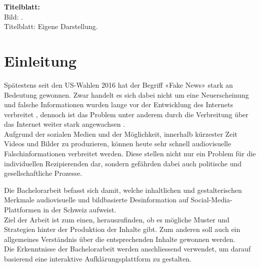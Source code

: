 \documentclass[12pt,a4paper]{article}        %
\begin{document}
 \textbf{Titelblatt:}\\
Bild: .\\
Titelblatt: Eigene Darstellung.
\pagebreak
\thispagestyle{empty}
\setcounter{page}{0}    %
\tableofcontents        %
\pagebreak

\section{Einleitung}
Spätestens seit den US-Wahlen 2016 hat der Begriff «Fake News» stark an Bedeutung gewonnen. Zwar handelt es sich dabei nicht um eine Neuerscheinung und falsche Informationen wurden lange vor der Entwicklung des Internets verbreitet \parencites[214]{allcott_social_2017}[247]{hohlfeld_schlechte_2020}[1]{khan_fake_2021}, dennoch ist das Problem unter anderem durch die Verbreitung über das Internet weiter stark angewachsen \parencites[214–215]{allcott_social_2017}[1]{khan_fake_2021}[1]{lazer_science_2018}[4]{ceron_fake_2021}.\\
Aufgrund der sozialen Medien und der Möglichkeit, innerhalb kürzester Zeit Videos und Bilder zu produzieren, können heute sehr schnell audiovisuelle Falschinformationen verbreitet werden. Diese stellen nicht nur ein Problem für die individuellen Rezipierenden dar, sondern gefährden dabei auch politische und gesellschaftliche Prozesse.

Die Bachelorarbeit befasst sich damit, welche inhaltlichen und gestalterischen Merkmale audiovisuelle und bildbasierte Desinformation auf Social-Media-Plattformen in der Schweiz aufweist. \\
Ziel der Arbeit ist zum einen, herauszufinden, ob es mögliche Muster und Strategien hinter der Produktion der Inhalte gibt. Zum anderen soll auch ein allgemeines Verständnis über die entsprechenden Inhalte gewonnen werden. \\
Die Erkenntnisse der Bachelorarbeit werden anschliessend verwendet, um darauf basierend eine interaktive Aufklärungsplattform zu gestalten.
\end{document}
